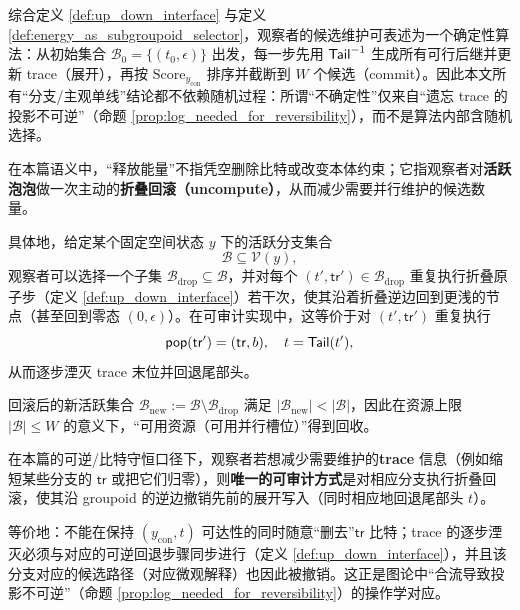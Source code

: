 \begin{remark}\label{rem:deterministic_beam_algorithm}
综合定义 \ref{def:up_down_interface} 与定义 \ref{def:energy_as_subgroupoid_selector}，观察者的候选维护可表述为一个确定性算法：从初始集合 \(\mathcal B_0=\{(t_0,\epsilon)\}\) 出发，每一步先用 \(\mathsf{Tail}^{-1}\) 生成所有可行后继并更新 trace（展开），再按 \(\mathrm{Score}_{y_{\mathrm{con}}}\) 排序并截断到 \(W\) 个候选（commit）。因此本文所有“分支/主观单线”结论都不依赖随机过程：所谓“不确定性”仅来自“遗忘 trace 的投影不可逆”（命题 \ref{prop:log_needed_for_reversibility}），而不是算法内部含随机选择。
\end{remark}

\begin{definition}\label{def:active_rollback_energy_reclaim}
在本篇语义中，“释放能量”不指凭空删除比特或改变本体约束；它指观察者对\textbf{活跃泡泡}做一次主动的\textbf{折叠回滚（uncompute）}，从而减少需要并行维护的候选数量。

具体地，给定某个固定空间状态 \(y\) 下的活跃分支集合
$$
\mathcal B\subseteq \mathcal V(y),
$$
观察者可以选择一个子集 \(\mathcal B_{\mathrm{drop}}\subseteq \mathcal B\)，并对每个 \((t',\mathsf{tr}')\in\mathcal B_{\mathrm{drop}}\) 重复执行折叠原子步（定义 \ref{def:up_down_interface}）若干次，使其沿着折叠逆边回到更浅的节点（甚至回到零态 \((0,\epsilon)\)）。在可审计实现中，这等价于对 \((t',\mathsf{tr}')\) 重复执行
$$
\mathsf{pop}(\mathsf{tr}')=(\mathsf{tr},b),\quad t=\mathsf{Tail}(t'),
$$
从而逐步湮灭 trace 末位并回退尾部头。

回滚后的新活跃集合 \(\mathcal B_{\mathrm{new}}:=\mathcal B\setminus \mathcal B_{\mathrm{drop}}\) 满足 \(|\mathcal B_{\mathrm{new}}|<|\mathcal B|\)，因此在资源上限 \(|\mathcal B|\le W\) 的意义下，“可用资源（可用并行槽位）”得到回收。
\end{definition}

\begin{proposition}[能量回收必须伴随时间纤维与微观解释候选的共同湮灭]\label{prop:energy_reclaim_requires_annihilation}
在本篇的可逆/比特守恒口径下，观察者若想减少需要维护的\textbf{trace} 信息（例如缩短某些分支的 \(\mathsf{tr}\) 或把它们归零），则\textbf{唯一的可审计方式}是对相应分支执行折叠回滚，使其沿 groupoid 的逆边撤销先前的展开写入（同时相应地回退尾部头 \(t\)）。

等价地：不能在保持 \((y_{\mathrm{con}},t)\) 可达性的同时随意“删去”\(\mathsf{tr}\) 比特；trace 的逐步湮灭必须与对应的可逆回退步骤同步进行（定义 \ref{def:up_down_interface}），并且该分支对应的候选路径（对应微观解释）也因此被撤销。这正是图论中“合流导致投影不可逆”（命题 \ref{prop:log_needed_for_reversibility}）的操作学对应。
\end{proposition}

